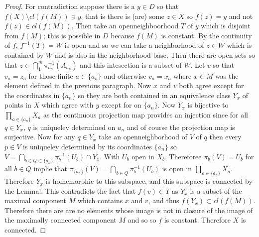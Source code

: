 \documentclass[11pt]{amsart}
\theoremstyle{definition}
\numberwithin{theorem}{section}
\numberwithin{definition}{section}
\numberwithin{equation}{section}
\begin{document}
\begin{proof}
For contradiction suppose there is a $y \in D$ so that $f(X) \setminus cl(f(M)) \ni y$, that is there is (are) some
$z \in X$ so $f(z) = y$ and not $f(z) \in cl(f(M)).$ Then take an openneighboorhood $T$ of $y$ which is disjoint from $f(M)$; this is possible in $D$ because $f(M)$ is constant. By the continuity of $f$, $f^{-1}(T) = W$ is open and so we can take a neighborhood of $z \in W$ which is contained by $W$ and is also in the neighborhood base. Then there are open sets so that $z \in \bigcap_{1}^m \pi^{-1}_{a_n}(A_{a_n})$ and this intesection is a subset of $W$.  Let $v$ so that $v_a =z_a$ for those finite $a \in \{a_n\}$ and otherwise $v_a = x_a$ where $x \in M$ was the element defined in the previous paragraph. Now $x$ and $v$ both agree except for the coordinates in $\{a_n\}$ so they are both contained in an equivalence class $Y_x$ of points in $X$ which agree with $y$ except for on $\{a_n\}$. Now $Y_x$ is bijective to $\prod_{a \in \{a_n\}}  X_a$ as the continuous projection map provides an injection since for all $q \in Y_x$, $q$ is uniqueley determined on $a_n$ and of course the projection map is surjective. Now for any $q \in Y_x$ take an openneighborhood of $V$ of $q$ then every $p \in V$ is uniqueley determined by its coordinates $\{a_n\}$ so $V = \bigcap_{b \in Q \subset \{a_n\}} \pi_b^{-1}(U_b) \cap Y_x$. With $U_b$ open in $X_b$. Thereforee $\pi_b(V) = U_b$ for all $b \in Q$ implie that $\pi_{\{a_n\}}(V) = \bigcap_{b\in Q} \pi_b^{-1}(U_b)$ is open in $\prod_{a \in \{a_n\}} X_{a}.$ Therefore $Y_x$ 
is homemorphic to this subspace, and this subspace is connected by the Lemma!. This contradicts  the fact that $f(v) \in T$ as $Y_x$ is a subset of the maximal component $M$ which contains $x$ and $v$, and thus $f(Y_x) \subset cl(f(M)).$ Therefore there are are no elements whose image is not in closure of the image of the maximally connected component $M$ and so so $f$ is constant. Therefore $X$ is connected.
\end{proof}
\end{document}
